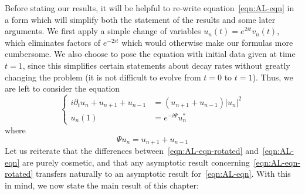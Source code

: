 \documentclass[letterpaper, reqno,final]{amsart}
\begin{document}
Before stating our results, it will be helpful to re-write equation~\eqref{eqn:AL-eqn} in a form which will simplify both the statement of the results and some later arguments. We first apply a simple change of variables $u_n(t) = e^{2it} v_n(t)$, which eliminates factors of $e^{-2it}$ which would otherwise make our formulas more cumbersome.  We also choose to pose the equation with initial data given at time $t = 1$, since this simplifies certain statements about decay rates without greatly changing the problem (it is not difficult to evolve from $t = 0$ to $t = 1$).  Thus, we are left to consider the equation
\begin{equation}\label{eqn:AL-eqn-rotated}
	\left\{\begin{aligned}
	    i\partial_t u_n + u_{n+1} + u_{n-1} &= (u_{n+1} + u_{n-1}) |u_n|^2\\
	    u_n(1) &= e^{-i\Psi} u^*_n
    \end{aligned}\right.
\end{equation}
where
\begin{equation*}
    \Psi u_n = u_{n+1} + u_{n-1}
\end{equation*}
Let us reiterate that the differences between~\eqref{eqn:AL-eqn-rotated} and~\eqref{eqn:AL-eqn} are purely cosmetic, and that any asymptotic result concerning~\eqref{eqn:AL-eqn-rotated} transfers naturally to an asymptotic result for~\eqref{eqn:AL-eqn}.  With this in mind, we now state the main result of this chapter:
\end{document}
